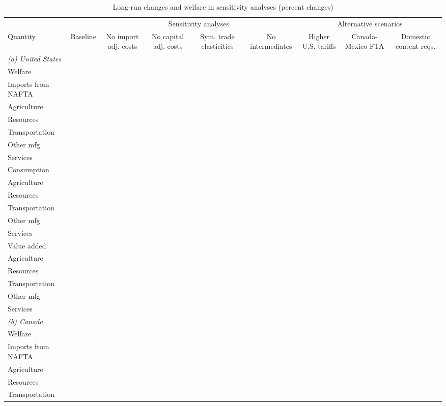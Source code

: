 \begin{table}[h!]
\footnotesize
\renewcommand{\arraystretch}{1.2}
\begin{center}
\caption{Long-run changes and welfare in sensitivity analyses (percent changes)}
\label{tab:welfare_and_sens}
\begin{tabular}{lcccccccc}\toprule
& & \multicolumn{4}{c}{Sensitivity analyses} & \multicolumn{3}{c}{Alternative scenarios}\\
\cmidrule(rl){3-6}\cmidrule(rl){7-9}
Quantity& \multicolumn{1}{p{1.5cm}}{\centering Baseline}& \multicolumn{1}{p{1.5cm}}{\centering No import adj. costs}& \multicolumn{1}{p{1.5cm}}{\centering No capital adj. costs}& \multicolumn{1}{p{1.5cm}}{\centering Sym. trade elasticities}& \multicolumn{1}{p{1.5cm}}{\centering No intermediates}& \multicolumn{1}{p{1.5cm}}{\centering Higher U.S. tariffs}& \multicolumn{1}{p{1.5cm}}{\centering Canada-Mexico FTA}& \multicolumn{1}{p{1.5cm}}{\centering Domestic content reqs.}\\
\midrule
\multicolumn{9}{l}{\textit{(a) United States}}\\
Welfare\\
Imports from NAFTA\\
\quad Agriculture\\
\quad Resources\\
\quad Transportation\\
\quad Other mfg\\
\quad Services\\
Consumption\\
\quad Agriculture\\
\quad Resources\\
\quad Transportation\\
\quad Other mfg\\
\quad Services\\
Value added\\
\quad Agriculture\\
\quad Resources\\
\quad Transportation\\
\quad Other mfg\\
\quad Services\\
\multicolumn{9}{l}{\textit{(b) Canada}}\\
Welfare\\
Imports from NAFTA\\
\quad Agriculture\\
\quad Resources\\
\quad Transportation\\

\end{tabular}
\end{center}
\end{table}
